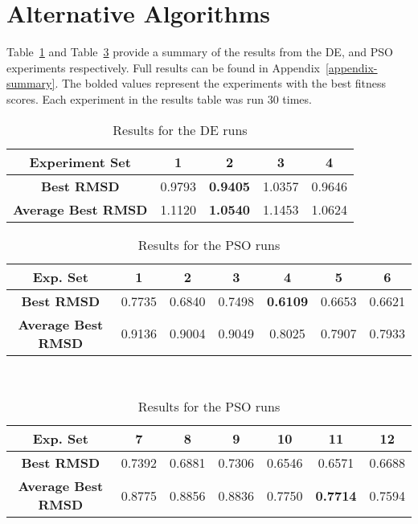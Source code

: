 \section{Alternative Algorithms}

Table~\ref{table:ea-de-results} and Table~\ref{table:ea-pso-results} provide a summary of the results from the DE, and PSO experiments respectively. Full results can be found in Appendix~\ref{appendix-summary}. The bolded values represent the experiments with the best fitness scores. Each experiment in the results table was run 30 times.

\begin{table}[H]
	\centering
	\begin{tabular}{ | >{\bfseries}c | c | c | c | c | }
		\hline
		Experiment Set & 1 & 2 & 3 & 4 \\ \hline
		Best RMSD & 0.9793 & \textbf{0.9405} & 1.0357 & 0.9646 \\ \hline
		Average Best RMSD & 1.1120 & \textbf{1.0540} & 1.1453 & 1.0624 \\ \hline
	\end{tabular}
	\caption{Results for the DE runs}
	\label{table:ea-de-results}
\end{table}

\begin{table}
	\centering
	\begin{tabular}{ | >{\bfseries}c | c | c | c | c | c | c | }
		\hline
		Exp. Set & 1 & 2 & 3 & 4 & 5 & 6 \\ \hline
		Best RMSD & 0.7735 & 0.6840 & 0.7498 & \textbf{0.6109} & 0.6653 & 0.6621 \\ \hline
		Average Best RMSD & 0.9136 & 0.9004 & 0.9049 & 0.8025 & 0.7907 & 0.7933 \\ \hline
	\end{tabular}
	\\
	\vspace{3 mm}
	\begin{tabular}{ | >{\bfseries}c | c | c | c | c | c | c | }
		\hline
		Exp. Set & 7 & 8 & 9 & 10 & 11 & 12 \\ \hline
		Best RMSD & 0.7392 & 0.6881 & 0.7306 & 0.6546 & 0.6571 & 0.6688 \\ \hline
		Average Best RMSD & 0.8775 & 0.8856 & 0.8836 & 0.7750 & \textbf{0.7714} & 0.7594 \\ \hline
	\end{tabular}
	\caption{Results for the PSO runs}
	\label{table:ea-pso-results}
\end{table}

